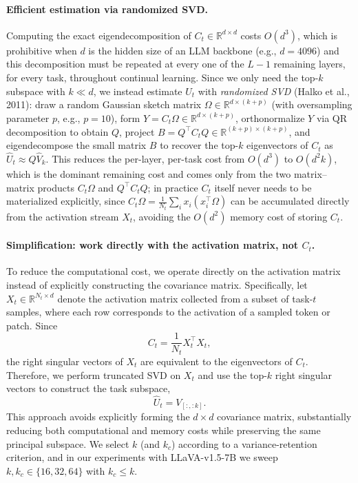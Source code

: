 \documentclass[a4paper]{article}
\begin{document}
\paragraph{Efficient estimation via randomized SVD.} Computing the exact eigendecomposition of $C_t\in\mathbb{R}^{d\times d}$ costs $O(d^3)$, which is prohibitive when $d$ is the hidden size of an LLM backbone (e.g., $d=4096$) and this decomposition must be repeated at every one of the $L{-}1$ remaining layers, for every task, throughout continual learning. Since we only need the top-$k$ subspace with $k\ll d$, we instead estimate $\hat U_t$ with \emph{randomized SVD} (Halko et al., 2011): draw a random Gaussian sketch matrix $\Omega\in\mathbb{R}^{d\times (k+p)}$ (with oversampling parameter $p$, e.g., $p=10$), form $Y = C_t\Omega \in \mathbb{R}^{d\times(k+p)}$, orthonormalize $Y$ via QR decomposition to obtain $Q$, project $B = Q^\top C_t Q \in \mathbb{R}^{(k+p)\times(k+p)}$, and eigendecompose the small matrix $B$ to recover the top-$k$ eigenvectors of $C_t$ as $\hat U_t \approx Q \hat V_k$. This reduces the per-layer, per-task cost from $O(d^3)$ to $O(d^2 k)$, which is the dominant remaining cost and comes only from the two matrix–matrix products $C_t\Omega$ and $Q^\top C_t Q$; in practice $C_t$ itself never needs to be materialized explicitly, since $C_t\Omega = \frac{1}{N_t}\sum_i x_i(x_i^\top\Omega)$ can be accumulated directly from the activation stream $X_t$, avoiding the $O(d^2)$ memory cost of storing $C_t$.

\paragraph{Simplification: work directly with the activation matrix, not $C_t$.}To reduce the computational cost, we operate directly on the activation matrix instead of explicitly constructing the covariance matrix. Specifically, let $X_t \in \mathbb{R}^{N_t \times d}$ denote the activation matrix collected from a subset of task-$t$ samples, where each row corresponds to the activation of a sampled token or patch. Since
\[
C_t = \frac{1}{N_t} X_t^\top X_t,
\]
the right singular vectors of $X_t$ are equivalent to the eigenvectors of $C_t$. Therefore, we perform truncated SVD on $X_t$ and use the top-$k$ right singular vectors to construct the task subspace,
\[
\hat{U}_t = V_{[:, :k]}.
\]
This approach avoids explicitly forming the $d \times d$ covariance matrix, substantially reducing both computational and memory costs while preserving the same principal subspace. We select $k$ (and $k_c$) according to a variance-retention criterion, and in our experiments with LLaVA-v1.5-7B we sweep $k, k_c \in \{16, 32, 64\}$ with $k_c \leq k$.
\end{document}
